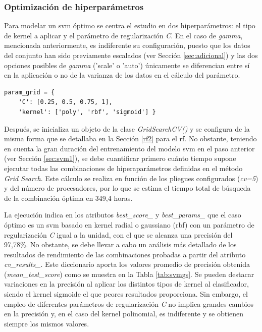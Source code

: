\subsubsection{Optimización de hiperparámetros}
\label{sec:svm2}

Para modelar un \gls{svm} óptimo se centra el estudio en dos hiperparámetros: el tipo de kernel a aplicar y el parámetro de regularización \textit{C}. En el caso de \textit{gamma}, mencionada anteriormente, es indiferente su configuración, puesto que los datos del conjunto han sido previamente escalados (ver Sección \ref{sec:adicional}) y las dos opciones posibles de \textit{gamma} ('scale' o 'auto') únicamente se diferencian entre sí en la aplicación o no de la varianza de los datos en el cálculo del parámetro. 

\vspace{3mm}

\begin{lstlisting}[style=Python, caption={Cuadrícula de parámetros SVM}]
  param_grid = {
    'C': [0.25, 0.5, 0.75, 1], 
    'kernel': ['poly', 'rbf', 'sigmoid'] }
\end{lstlisting}

\vspace{3mm}

Después, se inicializa un objeto de la clase \textit{GridSearchCV()} y se configura de la misma forma que se detallaba en la Sección \ref{rf2} para el \gls{rf}. No obstante, teniendo en cuenta la gran duración del entrenamiento del modelo \gls{svm} en el paso anterior (ver Sección \ref{sec:svm1}), se debe cuantificar primero cuánto tiempo supone ejecutar todas las combinaciones de hiperaparámetros definidas en el método \textit{Grid Search}. Este cálculo se realiza en función de los pliegues configurados (\textit{cv=5}) y del número de procesadores, por lo que se estima el tiempo total de búsqueda de la combinación óptima en 349,4 horas.

\vspace{3mm}

La ejecución indica en los atributos \textit{best\_score\_} y \textit{best\_params\_} que el caso óptimo es un \gls{svm} basado en kernel radial o gaussiano (\gls{rbf}) con un parámetro de regularización \textit{C} igual a la unidad, con el que se alcanza una precisión del 97,78\%. No obstante, se debe llevar a cabo un análisis más detallado de los resultados de rendimiento de las combinaciones probadas a partir del atributo \textit{cv\_results\_}. Este diccionario aporta los valores promedio de precisión obtenida (\textit{mean\_test\_score}) como se muestra en la Tabla \ref{tab:svmgs}. Se pueden destacar variaciones en la precisión al aplicar los distintos tipos de kernel al clasificador, siendo el kernel sigmoide el que peores resultados proporciona. Sin embargo, el empleo de diferentes parámetros de regularización \textit{C} no implica grandes cambios en la precisión y, en el caso del kernel polinomial, es indiferente y se obtienen siempre los mismos valores. 

